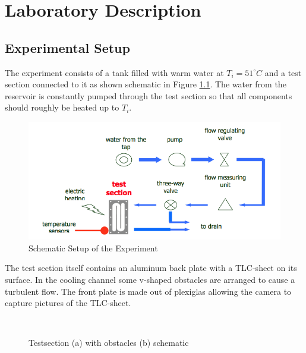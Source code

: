\chapter{Laboratory Description}\label{sec:experimentalsetup}

\section{Experimental Setup}
The experiment consists of a tank filled with warm water at $T_i=51 ^\circ C$ and a test section connected to it as shown schematic in Figure \ref{pic:schematic}. The water from the reservoir is constantly pumped through the test section so that all components should roughly be heated up to $T_i$. 
\begin{figure}[H]
\includegraphics[width=1.0\textwidth]{pics/schematic}
\caption{Schematic Setup of the Experiment}
\label{pic:schematic}
\end{figure}
The test section itself contains an aluminum back plate with a TLC-sheet on its surface. In the cooling channel some v-shaped obstacles are arranged to cause a turbulent flow. The front plate is made out of plexiglas allowing the camera to capture pictures of the TLC-sheet.
\begin{figure}[H]
\mbox{
\quad
{}}
\caption{Testsection (a) with obstacles (b) schematic}
\label{pic:testsection}
\end{figure}

